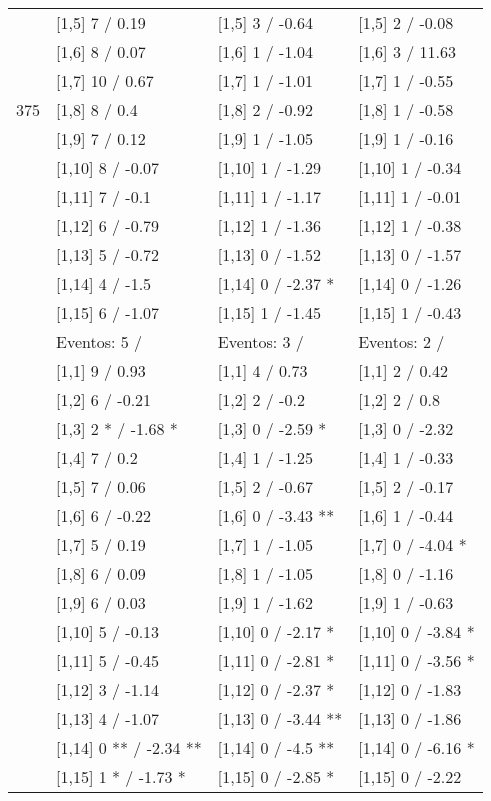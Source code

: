 \begin{table}
\begin{tabular}[t]{llll}
 & {}[1,5] 7  / 0.19 & {}[1,5] 3  / -0.64 & {}[1,5] 2  / -0.08\\
 & {}[1,6] 8  / 0.07 & {}[1,6] 1  / -1.04 & {}[1,6] 3  / 11.63\\
 & {}[1,7] 10  / 0.67 & {}[1,7] 1  / -1.01 & {}[1,7] 1  / -0.55\\
375 & {}[1,8] 8  / 0.4 & {}[1,8] 2  / -0.92 & {}[1,8] 1  / -0.58\\
\addlinespace
 & {}[1,9] 7  / 0.12 & {}[1,9] 1  / -1.05 & {}[1,9] 1  / -0.16\\
 & {}[1,10] 8  / -0.07 & {}[1,10] 1  / -1.29 & {}[1,10] 1  / -0.34\\
 & {}[1,11] 7  / -0.1 & {}[1,11] 1  / -1.17 & {}[1,11] 1  / -0.01\\
 & {}[1,12] 6  / -0.79 & {}[1,12] 1  / -1.36 & {}[1,12] 1  / -0.38\\
 & {}[1,13] 5  / -0.72 & {}[1,13] 0  / -1.52 & {}[1,13] 0  / -1.57\\
\addlinespace
 & {}[1,14] 4  / -1.5 & {}[1,14] 0  / -2.37 * & {}[1,14] 0  / -1.26\\
 & {}[1,15] 6  / -1.07 & {}[1,15] 1  / -1.45 & {}[1,15] 1  / -0.43\\
 & Eventos:  5 / & Eventos:  3 / & Eventos:  2 /\\
 & {}[1,1] 9  / 0.93 & {}[1,1] 4  / 0.73 & {}[1,1] 2  / 0.42\\
 & {}[1,2] 6  / -0.21 & {}[1,2] 2  / -0.2 & {}[1,2] 2  / 0.8\\
\addlinespace
 & {}[1,3] 2 * / -1.68 * & {}[1,3] 0  / -2.59 * & {}[1,3] 0  / -2.32\\
 & {}[1,4] 7  / 0.2 & {}[1,4] 1  / -1.25 & {}[1,4] 1  / -0.33\\
 & {}[1,5] 7  / 0.06 & {}[1,5] 2  / -0.67 & {}[1,5] 2  / -0.17\\
 & {}[1,6] 6  / -0.22 & {}[1,6] 0  / -3.43 ** & {}[1,6] 1  / -0.44\\
 & {}[1,7] 5  / 0.19 & {}[1,7] 1  / -1.05 & {}[1,7] 0  / -4.04 *\\
\addlinespace
500 & {}[1,8] 6  / 0.09 & {}[1,8] 1  / -1.05 & {}[1,8] 0  / -1.16\\
 & {}[1,9] 6  / 0.03 & {}[1,9] 1  / -1.62 & {}[1,9] 1  / -0.63\\
 & {}[1,10] 5  / -0.13 & {}[1,10] 0  / -2.17 * & {}[1,10] 0  / -3.84 *\\
 & {}[1,11] 5  / -0.45 & {}[1,11] 0  / -2.81 * & {}[1,11] 0  / -3.56 *\\
 & {}[1,12] 3  / -1.14 & {}[1,12] 0  / -2.37 * & {}[1,12] 0  / -1.83\\
\addlinespace
 & {}[1,13] 4  / -1.07 & {}[1,13] 0  / -3.44 ** & {}[1,13] 0  / -1.86\\
 & {}[1,14] 0 ** / -2.34 ** & {}[1,14] 0  / -4.5 ** & {}[1,14] 0  / -6.16 *\\
 & {}[1,15] 1 * / -1.73 * & {}[1,15] 0  / -2.85 * & {}[1,15] 0  / -2.22\\
\bottomrule
\end{tabular}
\end{table}
